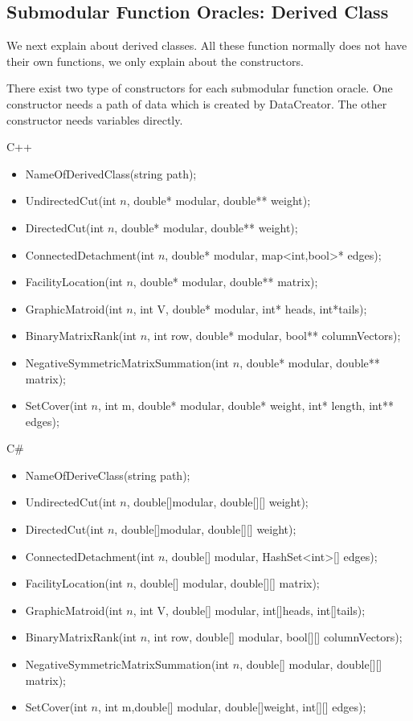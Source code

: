 \documentclass{article}
\begin{document}
\newpage

\subsection{Submodular Function Oracles: Derived Class}\label{oracleDrived}

We next explain about derived classes.
All these function normally does not have their own functions,
we only explain about the constructors.

There exist two type of constructors for each submodular function oracle.
One constructor needs a path of data which is created by DataCreator.
The other constructor needs variables directly.

\mbox{}

{\sf C++}
\begin{itemize}
\item NameOfDerivedClass(string path);
\item UndirectedCut(int $n$, double* modular, double** weight);
\item DirectedCut(int $n$, double* modular, double** weight);
\item ConnectedDetachment(int $n$, double* modular, map<int,bool>* edges);
\item FacilityLocation(int $n$, double* modular, double** matrix);
\item GraphicMatroid(int $n$, int V, double* modular, int* heads, int*tails);
\item BinaryMatrixRank(int $n$, int row, double* modular, bool** columnVectors);
\item NegativeSymmetricMatrixSummation(int $n$, double* modular, double** matrix);
\item SetCover(int $n$, int m, double* modular, double* weight, int* length, int** edges);
\end{itemize}

\mbox{}

{\sf C\#}
\begin{itemize}
\item NameOfDeriveClass(string path);
\item UndirectedCut(int $n$, double[]modular, double[][] weight);
\item DirectedCut(int $n$, double[]modular, double[][] weight);
\item ConnectedDetachment(int $n$, double[] modular, HashSet<int>[] edges);
\item FacilityLocation(int $n$, double[] modular, double[][] matrix);
\item GraphicMatroid(int $n$, int V, double[] modular, int[]heads, int[]tails);
\item BinaryMatrixRank(int $n$, int row, double[] modular, bool[][] columnVectors);
\item NegativeSymmetricMatrixSummation(int $n$, double[] modular, double[][] matrix);
\item SetCover(int $n$, int m,double[] modular, double[]weight, int[][] edges);
\end{itemize}
\end{document}
